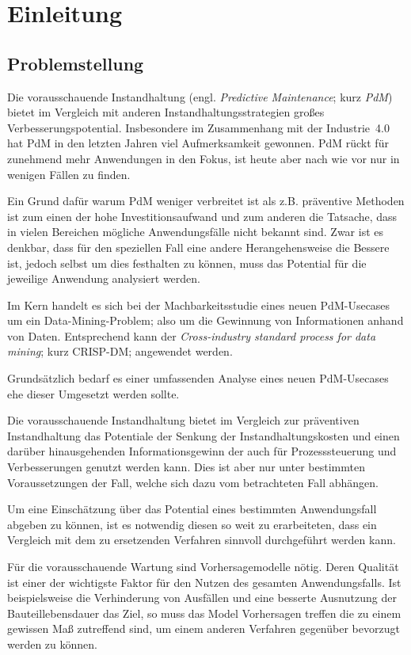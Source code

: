 \chapter{Einleitung}
\label{ch:einleitung}

\section{Problemstellung}
\label{sec:motivation}
Die vorausschauende Instandhaltung (engl. \textit{Predictive Maintenance}; kurz \textit{PdM}) bietet im Vergleich mit anderen Instandhaltungsstrategien großes Verbesserungspotential. Insbesondere im Zusammenhang mit der Industrie~{4.0} hat PdM in den letzten Jahren viel Aufmerksamkeit gewonnen. PdM rückt für zunehmend mehr Anwendungen in den Fokus, ist heute aber nach wie vor nur in wenigen Fällen zu finden. 

Ein Grund dafür warum PdM weniger verbreitet ist als z.B. präventive Methoden ist zum einen der hohe Investitionsaufwand und zum anderen die Tatsache, dass in vielen Bereichen mögliche Anwendungsfälle nicht bekannt sind. Zwar ist es denkbar, dass für den speziellen Fall eine andere Herangehensweise die Bessere ist, jedoch selbst um dies festhalten zu können, muss das Potential für die jeweilige Anwendung analysiert werden. 

Im Kern handelt es sich bei der Machbarkeitsstudie eines neuen PdM-Usecases um ein Data-Mining-Problem; also um die Gewinnung von Informationen anhand von Daten. Entsprechend kann der \textit{Cross-industry standard process for data mining}; kurz CRISP-DM; angewendet werden.

Grundsätzlich bedarf es einer umfassenden Analyse eines neuen PdM-Usecases ehe dieser Umgesetzt werden sollte.

Die vorausschauende Instandhaltung bietet im Vergleich zur präventiven Instandhaltung das Potentiale der Senkung der Instandhaltungskosten und einen darüber hinausgehenden Informationsgewinn der auch für Prozesssteuerung und Verbesserungen genutzt werden kann. Dies ist aber nur unter bestimmten Voraussetzungen der Fall, welche sich dazu vom betrachteten Fall abhängen.

Um eine Einschätzung über das Potential eines bestimmten Anwendungsfall abgeben zu können, ist es notwendig diesen so weit zu erarbeiteten, dass ein Vergleich mit dem zu ersetzenden Verfahren sinnvoll durchgeführt werden kann.

Für die vorausschauende Wartung sind Vorhersagemodelle nötig. Deren Qualität ist einer der wichtigste Faktor für den Nutzen des gesamten Anwendungsfalls. Ist beispielsweise die Verhinderung von Ausfällen und eine besserte Ausnutzung der Bauteillebensdauer das Ziel, so muss das Model Vorhersagen treffen die zu einem gewissen Maß zutreffend sind, um einem anderen Verfahren gegenüber bevorzugt werden zu können.

